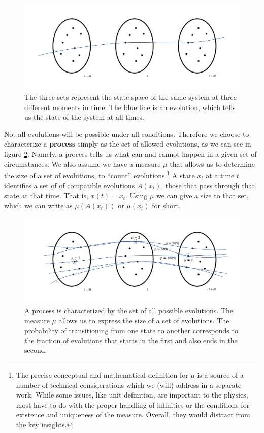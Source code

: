 \documentclass[letterpaper,twocolumn]{article}
\begin{document}
\begin{figure}[h]
	\includegraphics[width=\columnwidth]{images/Slide1.png}
	\caption{The three sets represent the state space of the same system at three different moments in time. The blue line is an evolution, which tells us the state of the system at all times.}\label{fig_single_evolution}
\end{figure}

Not all evolutions will be possible under all conditions. Therefore we choose to characterize a \textbf{process} simply as the set of allowed evolutions, as we can see in figure \ref{fig_process}. Namely, a process tells us what can and cannot happen in a given set of circumstances. We also assume we have a measure $\mu$ that allows us to determine the size of a set of evolutions, to ``count'' evolutions.\footnote{The precise conceptual and mathematical definition for $\mu$ is a source of a number of technical considerations which we (will) address in a separate work. While some issues, like unit definition, are important to the physics, most have to do with the proper handling of infinities or the conditions for existence and uniqueness of the measure. Overall, they would distract from the key insights.} A state $x_t$ at a time $t$ identifies a set of of compatible evolutions $A(x_t)$, those that pass through that state at that time. That is, $x(t) = x_t$. Using $\mu$ we can give a size to that set, which we can write as $\mu(A(x_t))$ or $\mu(x_t)$ for short.

\begin{figure}[h]
	\includegraphics[width=\columnwidth]{images/Slide2.png}
	\caption{A process is characterized by the set of all possible evolutions. The measure $\mu$ allows us to express the size of a set of evolutions. The probability of transitioning from one state to another corresponds to the fraction of evolutions that starts in the first and also ends in the second.}\label{fig_process}
\end{figure}
\end{document}
